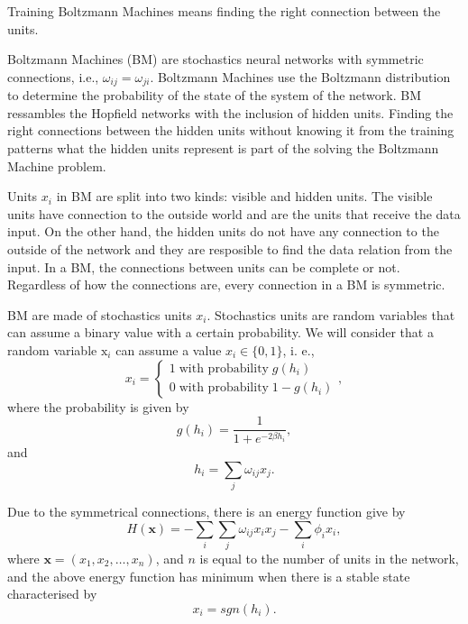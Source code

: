 Training Boltzmann Machines means finding the right connection between the units.

Boltzmann Machines (BM) are stochastics neural networks with symmetric connections, i.e., $\omega_{ij} = \omega_{ji}$.
Boltzmann Machines use the Boltzmann distribution to determine the probability of the state of the system of the network.
BM ressambles the Hopfield networks with the inclusion of hidden units.
Finding the right connections between the hidden units without knowing it from the training patterns what the hidden units represent is part of the solving the Boltzmann Machine problem.

Units $x_{i}$ in BM are split into two kinds: visible and hidden units.
The visible units have connection to the outside world and are the units that receive the data input.
On the other hand, the hidden units do not have any connection to the outside of the network and they are resposible to find the data relation from the input.
In a BM, the connections between units can be complete or not.
Regardless of how the connections are, every connection in a BM is symmetric.

BM are made of stochastics units $x_{i}$.
Stochastics units are random variables that can assume a binary value with a certain probability. 
We will consider that a random variable $\mathrm{x}_{i}$ can assume a value $x_{i} \in \{0, 1\}$, i. e.,
\begin{equation}
  x_{i} =
    \begin{cases}
      1 \; \text{with probability} \; g(h_{i}) \\
      0 \; \text{with probability} \; 1 - g(h_{i})
    \end{cases},
  \label{eq:stochastic-unit-values}
\end{equation}
where the probability is given by
\begin{equation}
  g(h_{i}) = \frac{1}{1 + e^{-2 \beta h_{i}}},
  \label{eq:stochastic-unit-prob}
\end{equation}
and
\begin{equation}
  h_{i} = \sum_{j}\omega_{ij}x_{j}.
  \label{eq:stochastic-unit-input}
\end{equation}

Due to the symmetrical connections, there is an energy function give by
\begin{equation}
  H(\mathbf{x}) = - \sum_{i} \sum_{j} \omega_{ij}x_{i}x_{j} - \sum_{i} \phi_{i}x_{i},
  \label{eq:eq4}
\end{equation}
where $\mathbf{x} = (x_{1}, x_{2}, \dots, x_{n})$, and $n$ is equal to the number of units in the network, and the above energy function has minimum when there is a stable state characterised by
\begin{equation}
  x_{i} = sgn(h_{i}).
  \label{eq:eq5}
\end{equation}

